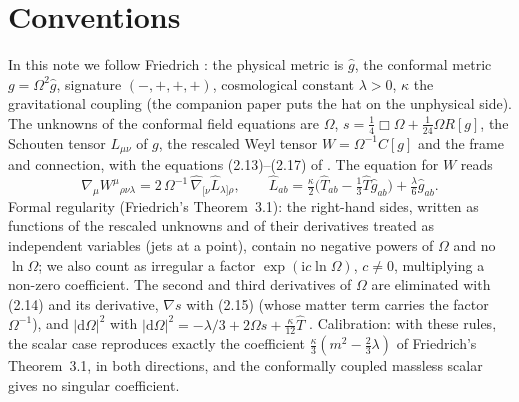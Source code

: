 \documentclass[11pt,a4paper]{article}
\newcommand{\dd}{\mathrm{d}}
\newcommand{\ii}{\mathrm{i}}
\begin{document}
\section{Conventions}
In this note we follow Friedrich \cite{Friedrich2015,Friedrich2017}: the physical metric is $\hat g$, the conformal metric $g=\Omega^{2}\hat g$, signature $(-,+,+,+)$, cosmological constant $\lambda>0$, $\kappa$ the gravitational coupling (the companion paper puts the hat on the unphysical side). The unknowns of the conformal field equations are $\Omega$, $s=\tfrac14\Box\Omega+\tfrac1{24}\Omega R[g]$, the Schouten tensor $L_{\mu\nu}$ of $g$, the rescaled Weyl tensor $W=\Omega^{-1}C[g]$ and the frame and connection, with the equations (2.13)--(2.17) of \cite{Friedrich2015}. The equation for $W$ reads
\begin{equation}
\nabla_{\mu}W^{\mu}{}_{\rho\nu\lambda}=2\,\Omega^{-1}\,\hat\nabla_{[\nu}\hat L_{\lambda]\rho},\qquad \hat L_{ab}=\tfrac{\kappa}{2}\big(\hat T_{ab}-\tfrac13\hat T\hat g_{ab}\big)+\tfrac{\lambda}{6}\hat g_{ab}.
\label{eq:weyl}
\end{equation}
Formal regularity (Friedrich's Theorem~3.1): the right-hand sides, written as functions of the rescaled unknowns and of their derivatives treated as independent variables (jets at a point), contain no negative powers of $\Omega$ and no $\ln\Omega$; we also count as irregular a factor $\exp(\ii c\ln\Omega)$, $c\neq0$, multiplying a non-zero coefficient. The second and third derivatives of $\Omega$ are eliminated with (2.14) and its derivative, $\nabla s$ with (2.15) (whose matter term carries the factor $\Omega^{-1}$), and $|\dd\Omega|^{2}$ with $|\dd\Omega|^{2}=-\lambda/3+2\Omega s+\tfrac{\kappa}{12}\hat T$ \cite[(3.8)]{Friedrich2015}. Calibration: with these rules, the scalar case reproduces exactly the coefficient $\tfrac{\kappa}{3}(m^{2}-\tfrac23\lambda)$ of Friedrich's Theorem~3.1, in both directions, and the conformally coupled massless scalar gives no singular coefficient.
\end{document}
